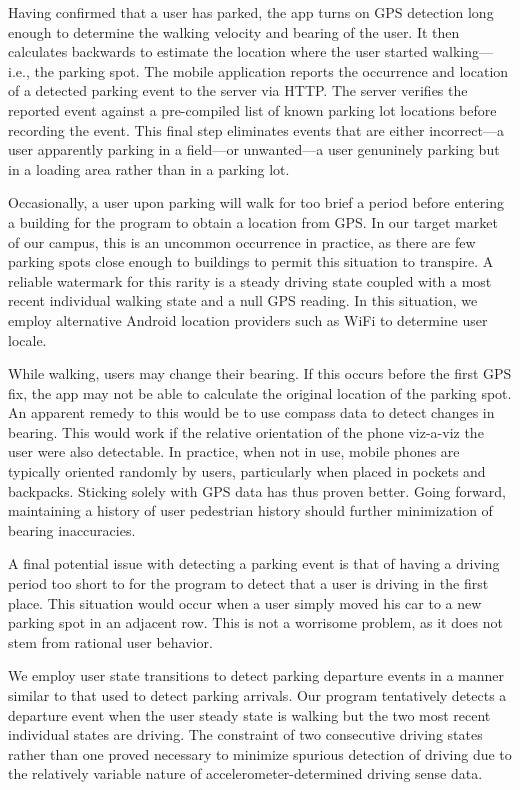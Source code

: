 Having confirmed that a user has parked, the app turns on GPS detection
long enough to determine the walking velocity and bearing of the user.  It
then calculates backwards to estimate the location where the user started
walking---i.e., the parking spot.  The mobile application reports the
occurrence and location of a detected parking event to the server via HTTP.
The server verifies the reported event against a pre-compiled list of known
parking lot locations before recording the event.  This final step eliminates
events that are either incorrect---a user apparently parking in a field---or
unwanted---a user genuninely parking but in a loading area rather than in
a parking lot.

Occasionally, a user upon parking will walk for too brief a period before
entering a building for the program to obtain a location from GPS.  In our
target market of our campus, this is an uncommon occurrence in practice,
as there are few parking spots close enough to buildings to permit this
situation to transpire.  A reliable watermark for this rarity is a steady
driving state coupled with a most recent individual walking state and a null
GPS reading.  In this situation, we employ alternative Android location
providers such as WiFi to determine user locale.

While walking, users may change their bearing.  If this occurs before the
first GPS fix, the app may not be able to calculate the original location
of the parking spot.  An apparent remedy to this would be to use compass
data to detect changes in bearing.  This would work if the relative
orientation of the phone viz-a-viz the user were also detectable.  In
practice, when not in use, mobile phones are typically oriented randomly by
users, particularly when placed in pockets and backpacks.  Sticking solely
with GPS data has thus proven better.  Going forward, maintaining a history
of user pedestrian history should further minimization of bearing
inaccuracies.

A final potential issue with detecting a parking event is that of having a
driving period too short to for the program to detect that a user is driving
in the first place.  This situation would occur when a user simply moved his
car to a new parking spot in an adjacent row.  This is not a worrisome
problem, as it does not stem from rational user behavior.

We employ user state transitions to detect parking departure events in a 
manner similar to that used to detect parking arrivals.  Our program
tentatively detects a departure event when the user steady state is walking
but the two most recent individual states are driving.  The constraint of
two consecutive driving states rather than one proved necessary to minimize
spurious detection of driving due to the relatively variable nature of
accelerometer-determined driving sense data.

